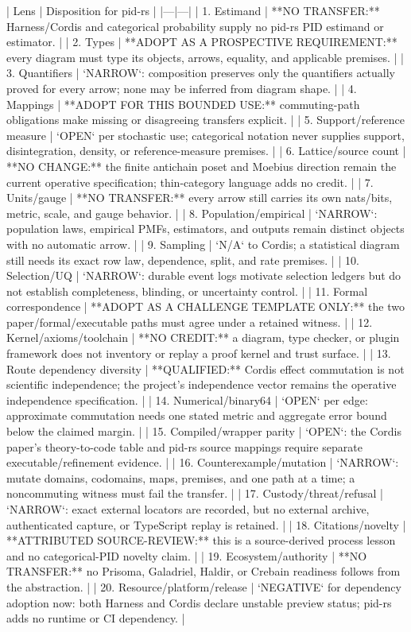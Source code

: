 \documentclass[11pt]{article}
\begin{document}
\begin{markdown}
| Lens | Disposition for pid-rs |
|---|---|
| 1. Estimand | **NO TRANSFER:** Harness/Cordis and categorical probability supply no pid-rs PID estimand or estimator. |
| 2. Types | **ADOPT AS A PROSPECTIVE REQUIREMENT:** every diagram must type its objects, arrows, equality, and applicable premises. |
| 3. Quantifiers | `NARROW`: composition preserves only the quantifiers actually proved for every arrow; none may be inferred from diagram shape. |
| 4. Mappings | **ADOPT FOR THIS BOUNDED USE:** commuting-path obligations make missing or disagreeing transfers explicit. |
| 5. Support/reference measure | `OPEN` per stochastic use; categorical notation never supplies support, disintegration, density, or reference-measure premises. |
| 6. Lattice/source count | **NO CHANGE:** the finite antichain poset and Moebius direction remain the current operative specification; thin-category language adds no credit. |
| 7. Units/gauge | **NO TRANSFER:** every arrow still carries its own nats/bits, metric, scale, and gauge behavior. |
| 8. Population/empirical | `NARROW`: population laws, empirical PMFs, estimators, and outputs remain distinct objects with no automatic arrow. |
| 9. Sampling | `N/A` to Cordis; a statistical diagram still needs its exact row law, dependence, split, and rate premises. |
| 10. Selection/UQ | `NARROW`: durable event logs motivate selection ledgers but do not establish completeness, blinding, or uncertainty control. |
| 11. Formal correspondence | **ADOPT AS A CHALLENGE TEMPLATE ONLY:** the two paper/formal/executable paths must agree under a retained witness. |
| 12. Kernel/axioms/toolchain | **NO CREDIT:** a diagram, type checker, or plugin framework does not inventory or replay a proof kernel and trust surface. |
| 13. Route dependency diversity | **QUALIFIED:** Cordis effect commutation is not scientific independence; the project's independence vector remains the operative independence specification. |
| 14. Numerical/binary64 | `OPEN` per edge: approximate commutation needs one stated metric and aggregate error bound below the claimed margin. |
| 15. Compiled/wrapper parity | `OPEN`: the Cordis paper's theory-to-code table and pid-rs source mappings require separate executable/refinement evidence. |
| 16. Counterexample/mutation | `NARROW`: mutate domains, codomains, maps, premises, and one path at a time; a noncommuting witness must fail the transfer. |
| 17. Custody/threat/refusal | `NARROW`: exact external locators are recorded, but no external archive, authenticated capture, or TypeScript replay is retained. |
| 18. Citations/novelty | **ATTRIBUTED SOURCE-REVIEW:** this is a source-derived process lesson and no categorical-PID novelty claim. |
| 19. Ecosystem/authority | **NO TRANSFER:** no Prisoma, Galadriel, Haldir, or Crebain readiness follows from the abstraction. |
| 20. Resource/platform/release | `NEGATIVE` for dependency adoption now: both Harness and Cordis declare unstable preview status; pid-rs adds no runtime or CI dependency. |


\end{markdown}
\end{document}
